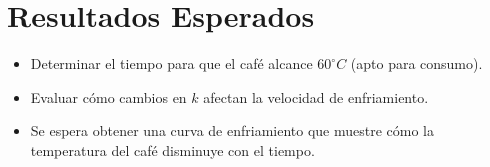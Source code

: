 \documentclass{article}
\begin{document}
\section{Resultados Esperados}
\begin{itemize}
    \item Determinar el tiempo para que el café alcance \(60^\circ C\) (apto para consumo).
    \item Evaluar cómo cambios en \(k\) afectan la velocidad de enfriamiento.
    \item Se espera obtener una curva de enfriamiento que muestre cómo la temperatura del café disminuye con el tiempo.
\end{itemize}
\end{document}

